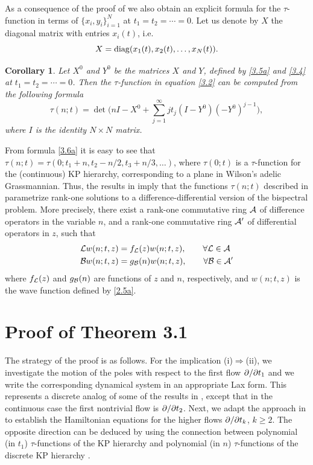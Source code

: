 \documentclass[11pt,reqno]{amsart}
\newtheorem{Corollary}[Theorem]{Corollary}
\theoremstyle{definition}
\numberwithin{equation}{section}
\begin{document}
As a consequence of the proof of  we also obtain an explicit 
formula for the $\tau$-function in terms of $\{x_i,y_i\}_{i=1}^N$ at 
$t_1=t_2=\cdots=0$. Let us denote by $X$ the diagonal matrix with entries 
$x_i(t)$, i.e. 
\begin{equation}\label{3.5a}
X=\mathrm{diag}(x_1(t),x_2(t),\dots,x_N(t)).
\end{equation}
\begin{Corollary}\label{co3.4}
Let $X^0$ and $Y^0$ be the matrices $X$ and $Y$, defined by \eqref{3.5a} and 
\eqref{3.4} at $t_1=t_2=\cdots=0$. Then the $\tau$-function in equation 
\eqref{3.2} can be computed from the following formula
\begin{equation}\label{3.6a}
\tau(n;t)
=\det\Big(nI-X^0+\sum_{j=1}^{\infty}jt_j(I-Y^0)(-Y^0)^{j-1}\Big),
\end{equation}
where $I$ is the identity $N\times N$ matrix.
\end{Corollary}
From formula \eqref{3.6a} it is easy to see that 
$\tau(n;t)=\tau(0;t_1+n,t_2-n/2,t_3+n/3,\dots)$, where $\tau(0;t)$ is 
a $\tau$-function for the (continuous) KP hierarchy, corresponding to 
a plane in Wilson's adelic Grassmannian. Thus, the results in \cite{HI} 
imply that the functions $\tau(n;t)$ described in  parametrize 
rank-one solutions to a difference-differential version of the bispectral 
problem. More precisely, there exist a rank-one commutative ring ${\mathcal A}$ of 
difference operators in the variable $n$, and a rank-one commutative ring 
${\mathcal A}'$ of differential operators in $z$, such that 
\begin{align*}
{\mathcal L} w(n;t,z)& = f_{{\mathcal L}}(z)w(n;t,z), \qquad\forall {\mathcal L}\in{\mathcal A}\\
{\mathcal B} w(n;t,z)& = g_{{\mathcal B}}(n)w(n;t,z), \qquad\forall {\mathcal B}\in{\mathcal A}'
\end{align*}
where $f_{{\mathcal L}}(z)$ and $g_{{\mathcal B}}(n)$ are functions of $z$ and $n$, 
respectively, and $w(n;t,z)$ is the wave function defined by \eqref{2.5a}.

\section{Proof of Theorem 3.1}                          \label{se4}
The strategy of the proof is as follows. For the implication 
(i)$\Rightarrow$(ii), we investigate the motion 
of the poles with respect to the first flow $\partial/\partial t_1$ and we write 
the corresponding dynamical system in an appropriate Lax form. This 
represents a discrete analog of some of the results in \cite{K,M}, except that 
in the continuous case the first nontrivial flow is $\partial/\partial t_2$. Next, we 
adapt the approach in \cite{Sh} to establish the Hamiltonian equations for 
the higher flows $\partial/\partial t_k$, $k\geq 2$. The opposite direction can be 
deduced by using the connection between polynomial (in $t_1$) $\tau$-functions 
of the KP hierarchy and polynomial (in $n$) $\tau$-functions of the discrete 
KP hierarchy \cite{HI}.
\end{document}

